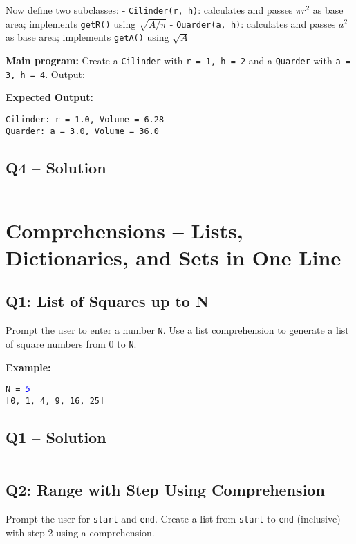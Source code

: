 \documentclass[a4paper,11pt]{article}
\begin{document}
Now define two subclasses:
- \texttt{Cilinder(r, h)}: calculates and passes $\pi r^2$ as base area; implements \texttt{getR()} using $\sqrt{A/\pi}$
- \texttt{Quarder(a, h)}: calculates and passes $a^2$ as base area; implements \texttt{getA()} using $\sqrt{A}$

\textbf{Main program:}
Create a \texttt{Cilinder} with \texttt{r = 1, h = 2} and a \texttt{Quarder} with \texttt{a = 3, h = 4}. Output:

\textbf{Expected Output:}
\begin{flushleft}
	\texttt{Cilinder: r = 1.0, Volume = 6.28}\\
	\texttt{Quarder: a = 3.0, Volume = 36.0}
\end{flushleft}


\subsection*{Q4 – Solution}
\inputminted{python}{Files/10/4.py}


\section{Comprehensions – Lists, Dictionaries, and Sets in One Line}

\subsection*{Q1: List of Squares up to N}
Prompt the user to enter a number \texttt{N}. Use a list comprehension to generate a list of square numbers from 0 to \texttt{N}.

\textbf{Example:}
\begin{flushleft}
	\texttt{N = \textcolor{blue}{\textit{5}}}\\
	\texttt{[0, 1, 4, 9, 16, 25]}
\end{flushleft}


\subsection*{Q1 – Solution}
\inputminted{python}{Files/11/1.py}

\subsection*{Q2: Range with Step Using Comprehension}
Prompt the user for \texttt{start} and \texttt{end}. Create a list from \texttt{start} to \texttt{end} (inclusive) with step 2 using a comprehension.
\end{document}
